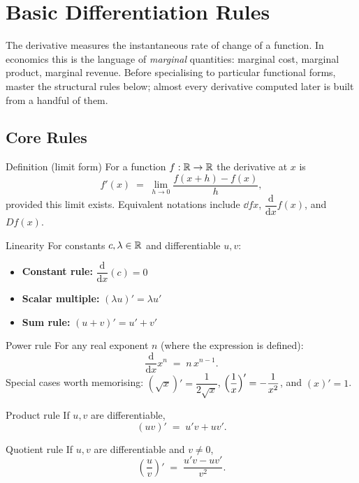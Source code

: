 \chapter{Basic Differentiation Rules}

The derivative measures the instantaneous rate of change of a function. In
economics this is the language of \emph{marginal} quantities: marginal cost,
marginal product, marginal revenue. Before specialising to particular
functional forms, master the structural rules below; almost every derivative
computed later is built from a handful of them.

\section{Core Rules}

\begin{rulebox}{Definition (limit form)}
For a function $f:\mathbb{R}\to\mathbb{R}$ the derivative at $x$ is
\[
  f'(x) \;=\; \lim_{h\to 0}\frac{f(x+h)-f(x)}{h},
\]
provided this limit exists. Equivalent notations include $\dd{f}{x}$,
$\dfrac{\mathrm{d}}{\mathrm{d}x}f(x)$, and $Df(x)$.
\end{rulebox}

\begin{rulebox}{Linearity}
For constants $c,\lambda\in\mathbb{R}$ and differentiable $u,v$:
\begin{itemize}[leftmargin=1.6em,itemsep=0.3ex]
  \item \textbf{Constant rule:} $\dfrac{\mathrm{d}}{\mathrm{d}x}(c)=0$
  \item \textbf{Scalar multiple:} $(\lambda u)'=\lambda u'$
  \item \textbf{Sum rule:} $(u+v)'=u'+v'$
\end{itemize}
\end{rulebox}

\begin{rulebox}{Power rule}
For any real exponent $n$ (where the expression is defined):
\[
  \frac{\mathrm{d}}{\mathrm{d}x}x^{n} \;=\; n\,x^{n-1} .
\]
Special cases worth memorising: $(\sqrt{x})'=\dfrac{1}{2\sqrt{x}}$,
$\Bigl(\dfrac{1}{x}\Bigr)'=-\dfrac{1}{x^{2}}$, and $(x)'=1$.
\end{rulebox}

\begin{rulebox}{Product rule}
If $u,v$ are differentiable,
\[
  (uv)' \;=\; u'v+uv' .
\]
\end{rulebox}

\begin{rulebox}{Quotient rule}
If $u,v$ are differentiable and $v\neq 0$,
\[
  \left(\frac{u}{v}\right)' \;=\; \frac{u'v-uv'}{v^{2}} .
\]
\end{rulebox}

